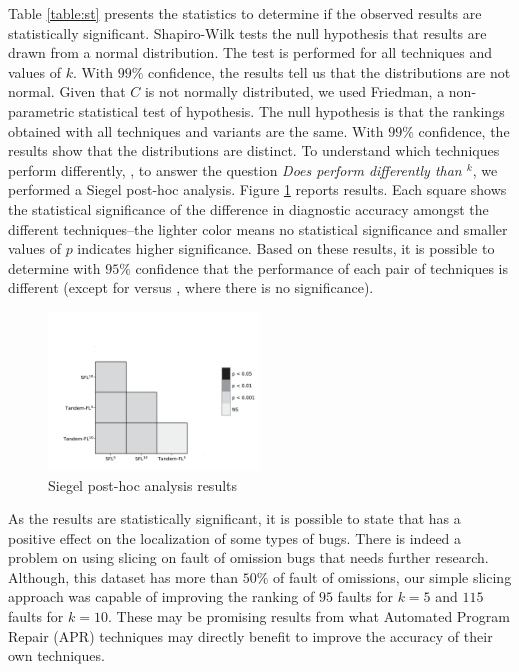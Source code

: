 \documentclass{article}
\begin{document}
Table \ref{table:st} presents the statistics to determine if the
observed results are statistically significant. Shapiro-Wilk tests the
null hypothesis that results are drawn from a normal distribution. The
test is performed for all techniques and values of $k$. With $99\%$
confidence, the results tell us that the distributions are not
normal. Given that $C$ is not normally distributed, we used Friedman, a
non-parametric statistical test of hypothesis. The null hypothesis is
that the rankings obtained with all techniques and variants are the
same. With $99\%$ confidence, the results show that the distributions
are distinct. To understand which techniques perform differently,
\ie{}, to answer the question \textit{Does  perform
  differently than \sfl{}$^{k}$}, we performed a Siegel post-hoc
analysis. Figure \ref{fig:performance} reports results. Each square
shows the statistical significance of the difference in diagnostic
accuracy amongst the different techniques--the lighter color means no
statistical significance and smaller values of $p$ indicates higher significance. 
Based on these results, it is possible to determine with $95\%$ confidence that the
performance of each pair of techniques is different (except for  
versus , where there is no significance).

\begin{figure}[tb]
	\vspace{-2cm}
		\includegraphics[width=0.5\textwidth]{figures/heatmap_seg_result.png}
		\caption{Siegel post-hoc analysis results}
		\label{fig:performance}
		\vspace{-0.2cm}
\end{figure}

As the results are statistically significant, it is possible to state
that  has a positive effect on the localization of some
types of bugs. There is indeed a problem on using slicing on fault of
omission bugs that needs further research.  Although, this dataset has
more than $50\%$ of fault of omissions, our simple slicing approach
was capable of improving the ranking of $95$ faults for $k=5$ and
$115$ faults for $k=10$. These may be promising results from what Automated
Program Repair (APR) techniques may directly benefit to improve the accuracy
of their own techniques. 
\end{document}
